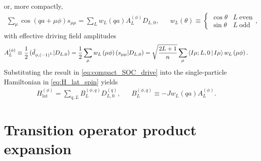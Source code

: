 \documentclass[nofootinbib,notitlepage,11pt]{revtex4-2}
\renewcommand{\t}{\text} %
\newcommand{\f}[2]{\dfrac{#1}{#2}} %
\newcommand{\p}[1]{\left(#1\right)} %
\newcommand{\bk}{\Braket} %
\newcommand{\1}{\mathds{1}}
\def\obk#1{\mathinner{({#1})}}
\begin{document}
or, more compactly,
\begin{align}
  \sum_\mu \cos\p{qa+\mu\phi} s_{\mu\mu}
  = \sum_L w_L\p{qa} A_L^{(\phi)} D_{L,0},
  &&
  w_L\p{\theta} \equiv
  \begin{cases}
    \cos\theta & L~\t{even} \\
    \sin\theta & L~\t{odd}
  \end{cases},
  \label{eq:compact_SOC_drive}
\end{align}
with effective driving field amplitudes
\begin{align}
  A_L^{(\phi)}
  \equiv \f12 \obk{\tilde d_{\phi,\p{-1}^L}|D_{L,0}}
  = \f12 \sum_\mu w_L\p{\mu\phi} \obk{s_{\mu\mu}|D_{L,0}}
  = \sqrt{\f{2L+1}{n}}
  \sum_\mu \bk{I\mu;L,0|I\mu} w_L\p{\mu\phi}.
\end{align}
Substituting the result in \eqref{eq:compact_SOC_drive} into the
single-particle Hamiltonian in \eqref{eq:H_lat_spin} yields
\begin{align}
  H_{\t{lat}}^{(\phi)} = \sum_{q,L} B_L^{(\phi,q)} D_{L,0}^{(q)},
  &&
  B_L^{(\phi,q)} \equiv -J w_L\p{qa} A_L^{(\phi)}.
\end{align}

\section{Transition operator product expansion}
\label{sec:trans_prod}
\end{document}
